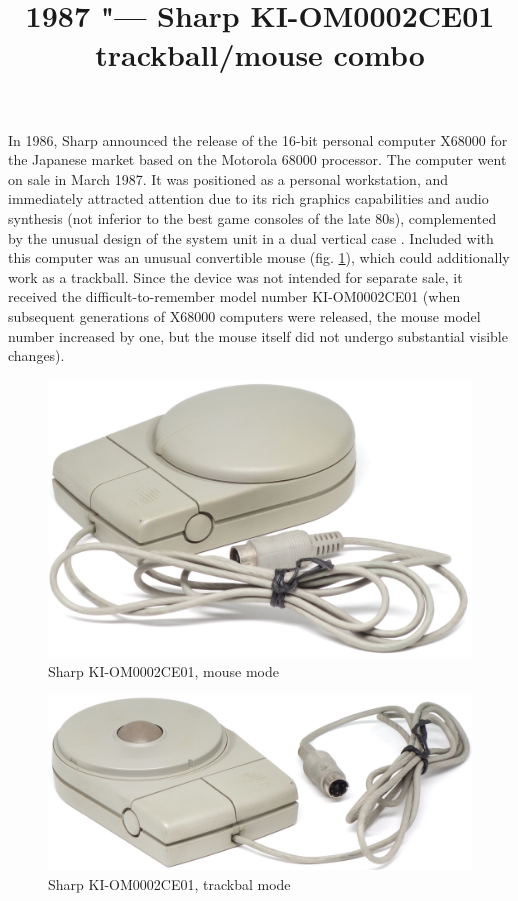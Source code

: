 \documentclass[11pt, a4paper]{article}
\begin{document}
\title{1987 "--- Sharp KI-OM0002CE01 trackball/mouse combo}
\date{}
\maketitle
{}
In 1986, Sharp announced the release of the 16-bit personal computer X68000 for the Japanese market based on the Motorola 68000 processor. The computer went on sale in March 1987. It was positioned as a personal workstation, and immediately attracted attention due to its rich graphics capabilities and audio synthesis (not inferior to the best game consoles of the late 80s), complemented by the unusual design of the system unit in a dual vertical case \cite{museum}. Included with this computer was an unusual convertible mouse (fig. \ref{fig:SharpConvertibleMouse}), which could additionally work as a trackball. Since the device was not intended for separate sale, it received the difficult-to-remember model number KI-OM0002CE01 (when subsequent generations of X68000 computers were released, the mouse model number increased by one, but the mouse itself did not undergo substantial visible changes).

\begin{figure}[h]
    \centering
    \includegraphics[scale=0.68]{1987_sharp_convertible/picmouse_60}
    \caption{Sharp KI-OM0002CE01, mouse mode}
    \label{fig:SharpConvertibleMouse}
\end{figure}

\begin{figure}[h]
    \centering
    \includegraphics[scale=0.68]{1987_sharp_convertible/picball_60}
    \caption{Sharp KI-OM0002CE01, trackbal mode}
    \label{fig:SharpConvertibleTrackball}
\end{figure}
\end{document}
